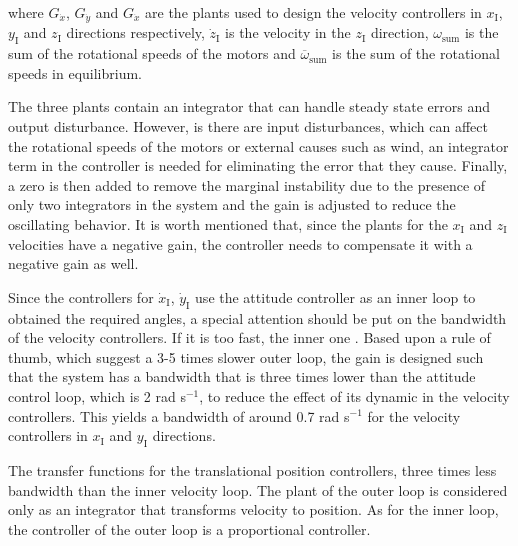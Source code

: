 \noindent where $G_{\dot{x}}$, $G_{\dot{y}}$ and $G_{\dot{x}}$  are the plants used to design the velocity controllers in $x_{\mathrm{I}}$, $y_{\mathrm{I}}$ and $z_{\mathrm{I}}$ directions respectively,  $\dot{z}_\mathrm{I}$ is the velocity in the $z_{\mathrm{I}}$ direction, $\omega_{\mathrm{sum}}$ is the sum of the rotational speeds of the motors and $\overline{\omega}_{\mathrm{sum}}$ is the sum of the rotational speeds in equilibrium.

The three plants contain an integrator that can handle steady state errors and output disturbance. However, is there are input disturbances, which can affect the rotational speeds of the motors or external causes such as wind, an integrator term in the controller is needed for eliminating the error that they cause. Finally, a zero is then added to remove the marginal instability due to the presence of only two integrators in the system and the gain is adjusted to reduce the oscillating behavior. It is worth mentioned that, since the plants for the $x_{\mathrm{I}}$ and $z_{\mathrm{I}}$ velocities have a negative gain, the controller needs to compensate it with a negative gain as well.

Since the controllers for $\dot{x}_{\mathrm{I}}$, $\dot{y}_{\mathrm{I}}$ use the attitude controller as an inner loop to obtained the required angles, a special attention should be put on the bandwidth of the velocity controllers. If it is too fast, the inner one . Based upon a rule of thumb, which suggest a 3-5 times slower outer loop, the gain is designed such that the system has a bandwidth that is three times lower than the attitude control loop, which is 2 rad s$^{-1}$, to reduce the effect of its dynamic in the velocity controllers. This yields a bandwidth of around 0.7 rad s$^{-1}$ for the velocity controllers in $x_{\mathrm{I}}$ and $y_{\mathrm{I}}$ directions.

The transfer functions for the translational position controllers, three times less bandwidth than the inner velocity loop. The plant of the outer loop is considered only as an integrator that transforms velocity to position. As for the inner loop, the controller of the outer loop is a proportional controller. \\

